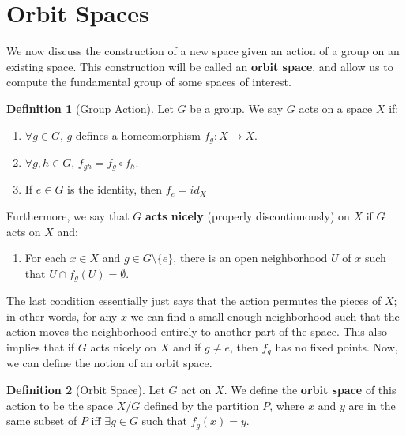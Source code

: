 \documentclass[11pt, oneside]{amsart}   	%
\theoremstyle{definition}
\newtheorem{definition}{Definition}[section]
\begin{document}
\section{Orbit Spaces}

	We now discuss the construction of a new space given an action of a group on an existing space. This construction will be called an \textbf{orbit space}, and 
	allow us to compute the fundamental group of some spaces of interest.
	
	\begin{definition}[Group Action]
		Let $G$ be a group. We say $G$ acts on a space $X$ if:
		\begin{enumerate}
			\item $\forall g\in G$, $g$ defines a homeomorphism $f_g : X\rightarrow X$.
			\item $\forall g, h\in G$, $f_{gh} = f_g\circ f_h$. 
			\item If $e\in G$ is the identity, then $f_e = id_X$
		\end{enumerate}
		Furthermore, we say that $G$ \textbf{acts nicely} (properly discontinuously) on $X$ if $G$ acts on $X$ and:
		\begin{enumerate}[4.]
			\item For each $x\in X$ and $g\in G\setminus\{e\}$, there is an open neighborhood $U$ of $x$ such that $U\cap f_g(U) = \emptyset$.
		\end{enumerate}
	\end{definition}
	
	The last condition essentially just says that the action permutes the pieces of $X$; in other words, for any $x$ we can find a small enough neighborhood 
	such that the action moves the neighborhood entirely to another part of the space. This also implies that if $G$ acts nicely on $X$ and if $g\neq e$, then 
	$f_g$ has no fixed points. Now, we can define the notion of an orbit space.
	
	\begin{definition}[Orbit Space]
		Let $G$ act on $X$. We define the \textbf{orbit space} of this action to be the space $X / G$ defined by the partition $P$, where $x$ and $y$ are in the 
		same subset of $P$ iff $\exists g\in G$ such that $f_g(x) = y$. 
	\end{definition}
	
\end{document}

